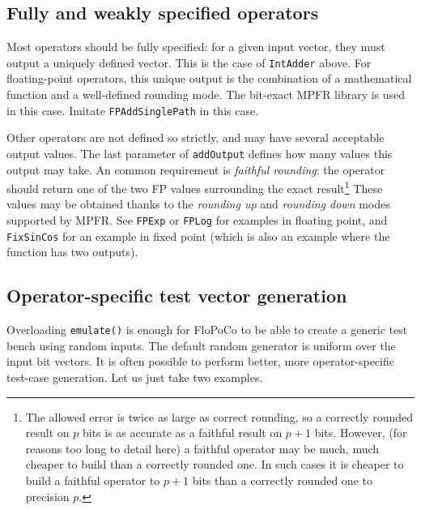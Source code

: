 \documentclass{article}
\begin{document}
\subsection{Fully and weakly specified operators}
 Most operators should be fully specified: for a given input
  vector, they must output a uniquely defined vector. This is the case of 
  \texttt{\small IntAdder} above. For floating-point
  operators, this unique output is the combination of a mathematical
  function and a well-defined rounding mode. The bit-exact MPFR
  library is used in this case. Imitate \texttt{\small FPAddSinglePath} in this case.

 Other operators are not defined so strictly, and may have  several acceptable output values.
 The last parameter of \texttt{\small addOutput} defines how many values this output may take.
 An common requirement is \emph{faithful rounding}: the operator should return one of the two FP values surrounding the exact result\footnote{
 The allowed error is twice as large as correct rounding, so a correctly rounded result on $p$ bits is as accurate as a faithful result on $p+1$ bits. 
 However, (for reasons too long to detail here) a faithful operator may be much, much cheaper to build than a correctly rounded one.
 In such cases it is cheaper to build a faithful operator to $p+1$ bits than a correctly rounded one to precision $p$.}
These values may be obtained thanks to the  \emph{rounding up} and \emph{rounding down} modes supported by MPFR.
See \texttt{\small FPExp} or \texttt{\small FPLog} for  examples in floating point, and \texttt{FixSinCos} for an example in fixed point (which is also an example where the function has two outputs).

\subsection{Operator-specific test  vector generation}
Overloading \texttt{\small emulate()} is enough for FloPoCo to be able
to create a generic test bench using random inputs. The default random generator is uniform over the input bit vectors. It is
often possible to perform better, more operator-specific test-case
generation. Let us just take two examples.
\end{document}
